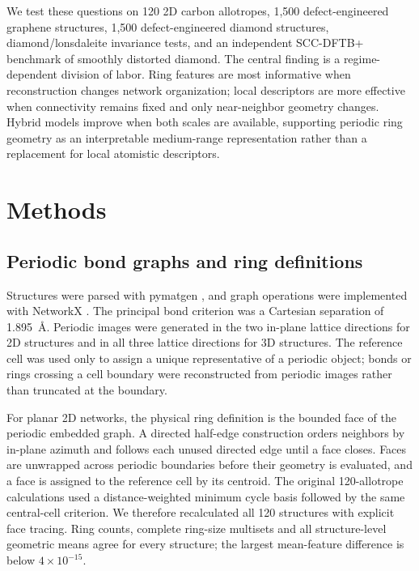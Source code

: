 \documentclass[twoside,twocolumn,9pt]{article}
\begin{document}
We test these questions on 120 2D carbon allotropes, 1,500 defect-engineered graphene structures, 1,500 defect-engineered diamond structures, diamond/lonsdaleite invariance tests, and an independent SCC-DFTB+ benchmark of smoothly distorted diamond. The central finding is a regime-dependent division of labor. Ring features are most informative when reconstruction changes network organization; local descriptors are more effective when connectivity remains fixed and only near-neighbor geometry changes. Hybrid models improve when both scales are available, supporting periodic ring geometry as an interpretable medium-range representation rather than a replacement for local atomistic descriptors.
\section*{Methods}

\subsection*{Periodic bond graphs and ring definitions}

Structures were parsed with pymatgen \cite{Ong2013}, and graph operations were implemented with NetworkX \cite{Hagberg2008}. The principal bond criterion was a Cartesian separation of 1.895~\AA. Periodic images were generated in the two in-plane lattice directions for 2D structures and in all three lattice directions for 3D structures. The reference cell was used only to assign a unique representative of a periodic object; bonds or rings crossing a cell boundary were reconstructed from periodic images rather than truncated at the boundary.

For planar 2D networks, the physical ring definition is the bounded face of the periodic embedded graph. A directed half-edge construction orders neighbors by in-plane azimuth and follows each unused directed edge until a face closes. Faces are unwrapped across periodic boundaries before their geometry is evaluated, and a face is assigned to the reference cell by its centroid. The original 120-allotrope calculations used a distance-weighted minimum cycle basis followed by the same central-cell criterion. We therefore recalculated all 120 structures with explicit face tracing. Ring counts, complete ring-size multisets and all structure-level geometric means agree for every structure; the largest mean-feature difference is below \(4\times10^{-15}\).
\end{document}
